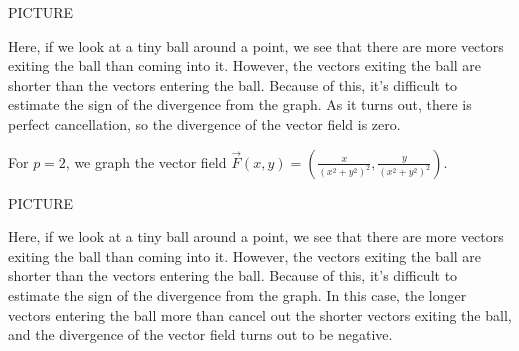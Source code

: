 \documentclass{ximera}
\begin{document}
PICTURE

Here, if we look at a tiny ball around a point, we see that there are more vectors exiting the ball than coming into it. However, the vectors exiting the ball are shorter than the vectors entering the ball. Because of this, it's difficult to estimate the sign of the divergence from the graph. As it turns out, there is perfect cancellation, so the divergence of the vector field is zero.

For $p=2$, we graph the vector field $\vec{F}(x,y) = \left(\frac{x}{(x^2+y^2)^2},\frac{y}{(x^2+y^2)^2} \right)$.

PICTURE

Here, if we look at a tiny ball around a point, we see that there are more vectors exiting the ball than coming into it. However, the vectors exiting the ball are shorter than the vectors entering the ball. Because of this, it's difficult to estimate the sign of the divergence from the graph. In this case, the longer vectors entering the ball more than cancel out the shorter vectors exiting the ball, and the divergence of the vector field turns out to be negative.
\end{document}

